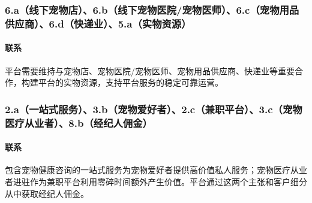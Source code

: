 \documentclass[a4paper]{ctexart}
\begin{document}
\subsubsection{6.a（线下宠物店）、6.b（线下宠物医院/宠物医师）、6.c（宠物用品供应商）、6.d（快递业）、5.a（实物资源）}
\paragraph{联系}平台需要维持与宠物店、宠物医院/宠物医师、宠物用品供应商、快递业等重要合作，构建平台的实物资源，支持平台服务的稳定可靠运营。
\subsubsection{2.a（一站式服务）、3.b（宠物爱好者）、2.c（兼职平台）、3.c（宠物医疗从业者）、8.b（经纪人佣金）}
\paragraph{联系}包含宠物健康咨询的一站式服务为宠物爱好者提供高价值私人服务；宠物医疗从业者进驻作为兼职平台利用零碎时间额外产生价值。平台通过这两个主张和客户细分从中获取经纪人佣金。
\end{document}
